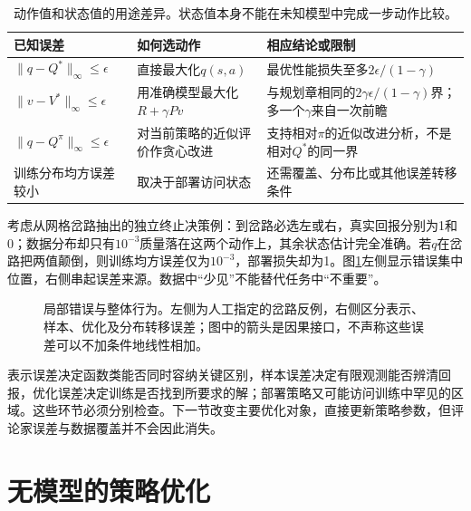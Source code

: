 \begin{table}[t]
  \centering
  \small
  \begin{tabularx}{\linewidth}{>{\raggedright\arraybackslash}p{31mm} >{\raggedright\arraybackslash}X >{\raggedright\arraybackslash}X}
    \toprule
    已知误差 & 如何选动作 & 相应结论或限制 \\
    \midrule
    $\lVert q-Q^*\rVert_\infty\leq\epsilon$ & 直接最大化$q(s,a)$ & 最优性能损失至多$2\epsilon/(1-\gamma)$ \\
    $\lVert v-V^*\rVert_\infty\leq\epsilon$ & 用准确模型最大化$R+\gamma Pv$ & 与规划章相同的$2\gamma\epsilon/(1-\gamma)$界；多一个$\gamma$来自一次前瞻 \\
    $\lVert q-Q^\pi\rVert_\infty\leq\epsilon$ & 对当前策略的近似评价作贪心改进 & 支持相对$\pi$的近似改进分析，不是相对$Q^*$的同一界 \\
    训练分布均方误差较小 & 取决于部署访问状态 & 还需覆盖、分布比或其他误差转移条件 \\
    \bottomrule
  \end{tabularx}
  \caption{动作值和状态值的用途差异。状态值本身不能在未知模型中完成一步动作比较。}
  \label{tab:rl-learning-value-bounds}
\end{table}

考虑从网格岔路抽出的独立终止决策例：到岔路必选左或右，真实回报分别为1和0；数据分布却只有$10^{-3}$质量落在这两个动作上，其余状态估计完全准确。若$q$在岔路把两值颠倒，则训练均方误差仅为$10^{-3}$，部署损失却为1。图\ref{fig:rl-learning-error-flow}左侧显示错误集中位置，右侧串起误差来源。数据中“少见”不能替代任务中“不重要”。

\begin{figure}[t]
  \centering
  
  \caption{局部错误与整体行为。左侧为人工指定的岔路反例，右侧区分表示、样本、优化及分布转移误差；图中的箭头是因果接口，不声称这些误差可以不加条件地线性相加。}
  \label{fig:rl-learning-error-flow}
\end{figure}

表示误差决定函数类能否同时容纳关键区别，样本误差决定有限观测能否辨清回报，优化误差决定训练是否找到所要求的解；部署策略又可能访问训练中罕见的区域。这些环节必须分别检查。下一节改变主要优化对象，直接更新策略参数，但评论家误差与数据覆盖并不会因此消失。

\section{无模型的策略优化}
\label{sec:rl-learning-policy}

